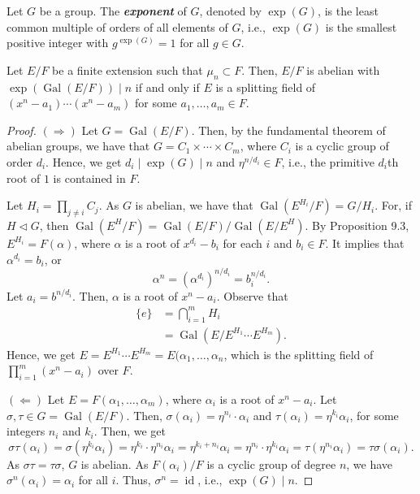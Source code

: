 \documentclass[twoside]{article}
\DeclareMathOperator\Gal{Gal}
\DeclareMathOperator\id{id}
\theoremstyle{remark}
\newcounter{theorem}
\newcommand*\term[1]{\textbf{\textit{\mathversion{bold}#1}}}
\begin{document}
\begin{definition}
  Let \(G\) be a group. The \term{exponent} of \(G\), denoted by \(\exp(G)\), is the least common multiple of orders of all elements of \(G\), i.e., \(\exp(G)\) is the smallest positive integer with \(g^{\exp(G)} = 1\) for all \(g \in G\).
\end{definition}

\begin{theorem}
  Let \(E/F\) be a finite extension such that \(\mu_n \subset F\). Then, \(E/F\) is abelian with \(\exp(\Gal(E/F)) \mid n\) if and only if \(E\) is a splitting field of \( (x^n-a_1) \cdots (x^n-a_m)\) for some \(a_1, \dots, a_m \in F\).
\end{theorem}

\begin{proof}
  \((\Rightarrow)\) Let \(G = \Gal(E/F)\). Then, by the fundamental theorem of abelian groups, we have that \(G = C_1 \times \cdots \times C_m\), where \(C_i\) is a cyclic group of order \(d_i\). Hence, we get \(d_i \mid \exp(G) \mid n\) and \(\eta^{n/d_i} \in F\), i.e., the primitive \(d_i\)th root of \(1\) is contained in \(F\).
  
  Let \(H_i = \prod_{j \neq i} C_j\). As \(G\) is abelian, we have that \(\Gal(E^{H_i}/F) = G/H_i\). For, if \(H \vartriangleleft G\), then \(\Gal(E^H/F) = \Gal(E/F) / \Gal(E/E^H)\). By Proposition 9.3, \(E^{H_i} = F(\alpha)\), where \(\alpha\) is a root of \(x^{d_i} - b_i\) for each \(i\) and \(b_i \in F\). It implies that \(\alpha^{d_i} = b_i\), or
  \[ \alpha^n = (\alpha^{d_i})^{n/d_i} = b_i^{n/d_i}. \]
  Let \(a_i = b^{n/d_i}\). Then, \(\alpha\) is a root of \(x^n - a_i\). Observe that
  \begin{align*}
    \{e\} & = \bigcap_{i=1}^m H_i \tag{by the definition of \(H_i\)} \\
    & = \Gal(E/E^{H_1} \cdots E^{H_m}). \tag{by the second remark above}
  \end{align*}
  Hence, we get \(E = E^{H_1} \cdots E^{H_m} = E(\alpha_1, \dots, \alpha_n\), which is the splitting field of \(\prod_{i=1}^m (x^n - a_i)\) over \(F\).
  
  \((\Leftarrow)\) Let \(E = F(\alpha_1, \dots, \alpha_m)\), where \(\alpha_i\) is a root of \(x^n - a_i\). Let \(\sigma, \tau \in G = \Gal(E/F)\). Then, \(\sigma(\alpha_i) = \eta^{n_i} \cdot \alpha_i\) and \(\tau(\alpha_i) = \eta^{k_i} \alpha_i\), for some integers \(n_i\) and \(k_i\). Then, we get
  \[ \sigma\tau(\alpha_i) = \sigma(\eta^{k_i}\alpha_i) = \eta^{k_i} \cdot \eta^{n_i} \alpha_i = \eta^{k_i + n_i} \alpha_i = \eta^{n_i} \cdot \eta^{k_i}\alpha_i = \tau(\eta^{n_i}\alpha_i) = \tau\sigma(\alpha_i). \]
  As \(\sigma\tau = \tau\sigma\), \(G\) is abelian. As \(F(\alpha_i)/F\) is a cyclic group of degree \(n\), we have \(\sigma^n(\alpha_i) = \alpha_i\) for all \(i\). Thus, \(\sigma^n = \id\), i.e., \(\exp(G) \mid n\).
\end{proof}
\end{document}
